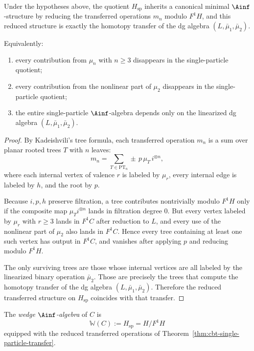 \begin{theorem}
\label{thm:cbt-single-particle-transfer}
\ClaimStatusProvedHere
Under the hypotheses above, the quotient $H_{\mathrm{sp}}$ inherits a canonical minimal $\Ainf$-structure by reducing the transferred operations $m_n$ modulo $F^1H$, and this reduced structure is exactly the homotopy transfer of the dg algebra $(L,\bar\mu_1,\bar\mu_2)$.

Equivalently:
\begin{enumerate}[label=\textup{(\alph*)},leftmargin=2em]
\item every contribution from $\mu_n$ with $n\ge 3$ disappears in the single-particle quotient;
\item every contribution from the nonlinear part of $\mu_2$ disappears in the single-particle quotient;
\item the entire single-particle $\Ainf$-algebra depends only on the linearized dg algebra $(L,\bar\mu_1,\bar\mu_2)$.
\end{enumerate}
\end{theorem}

\begin{proof}
By Kadeishvili's tree formula, each transferred operation $m_n$ is a sum over planar rooted trees $T$ with $n$ leaves:
\[
m_n=\sum_{T\in \mathrm{PT}_n}\pm\,p\,\mu_T\,i^{\otimes n},
\]
where each internal vertex of valence $r$ is labeled by $\mu_r$, every internal edge is labeled by $h$, and the root by $p$.

Because $i,p,h$ preserve filtration, a tree contributes nontrivially modulo $F^1H$ only if the composite map $\mu_T i^{\otimes n}$ lands in filtration degree $0$. But every vertex labeled by $\mu_r$ with $r\ge 3$ lands in $F^1C$ after reduction to $L$, and every use of the nonlinear part of $\mu_2$ also lands in $F^1C$. Hence every tree containing at least one such vertex has output in $F^1C$, and vanishes after applying $p$ and reducing modulo $F^1H$.

The only surviving trees are those whose internal vertices are all labeled by the linearized binary operation $\bar\mu_2$. Those are precisely the trees that compute the homotopy transfer of the dg algebra $(L,\bar\mu_1,\bar\mu_2)$. Therefore the reduced transferred structure on $H_{\mathrm{sp}}$ coincides with that transfer.
\end{proof}

\begin{definition}
\label{def:cbt-wedge-ainfty}
The \emph{wedge $\Ainf$-algebra} of $C$ is
\[
\mathbb{W}(C):=H_{\mathrm{sp}}=H/F^1H
\]
equipped with the reduced transferred operations of Theorem~\ref{thm:cbt-single-particle-transfer}.
\end{definition}

